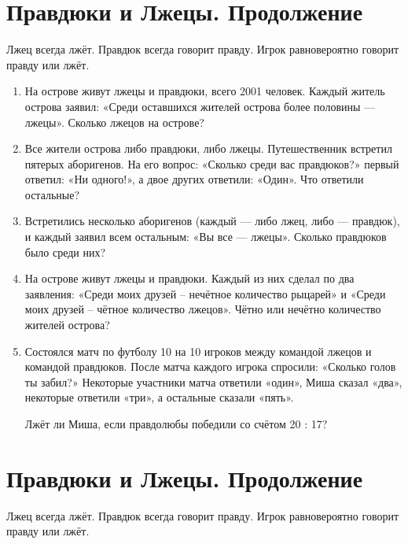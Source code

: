 \documentclass[12pt]{article}
\theoremstyle{definition}
\begin{document}
\newpage
\setcounter{section}{1}
\section{Правдюки и Лжецы. Продолжение}

Лжец всегда лжёт. Правдюк всегда говорит правду. Игрок равновероятно говорит правду или лжёт. 

\begin{enumerate}
  \item На острове живут лжецы и правдюки, всего 2001 человек. 
  Каждый житель острова заявил: «Среди оставшихся жителей острова более половины — лжецы». 
  Сколько лжецов на острове? 

  \item Все жители острова либо правдюки, либо лжецы. Путешественник встретил пятерых аборигенов. 
  На его вопрос: «Сколько среди вас правдюков?» первый ответил: «Ни одного!», а двое других ответили: «Один». 
  Что ответили остальные?

  \item Встретились несколько аборигенов (каждый — либо лжец, либо — правдюк), и каждый заявил всем остальным: «Вы все — лжецы». 
  Сколько правдюков было среди них?

  \item На острове живут лжецы и правдюки. 
  Каждый из них сделал по два заявления: «Среди моих друзей – нечётное количество рыцарей» и «Среди моих друзей – чётное количество лжецов». 
  Чётно или нечётно количество жителей острова? 

  \item Состоялся матч по футболу 10 на 10 игроков между командой лжецов и командой правдюков. 
  После матча каждого игрока спросили: «Сколько голов ты забил?» 
  Некоторые участники матча ответили «один», Миша сказал «два», некоторые ответили «три», а остальные сказали «пять». 
  
  Лжёт ли Миша, если правдолюбы победили со счётом  20 : 17? 
\end{enumerate}


\setcounter{section}{1}
\section{Правдюки и Лжецы. Продолжение}

Лжец всегда лжёт. Правдюк всегда говорит правду. Игрок равновероятно говорит правду или лжёт. 
\end{document}
